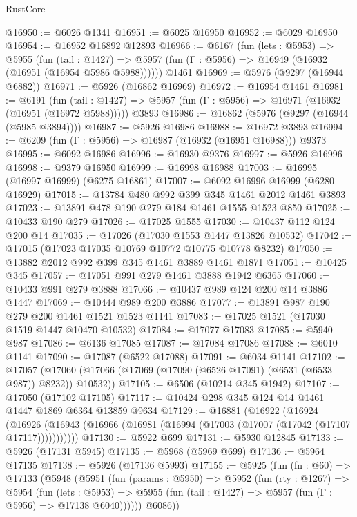 \begin{lexlean}{RustCore}
\begin{coremodule}
@16950 := @6026 @1341
@16951 := @6025 @16950
@16952 := @6029 @16950
@16954 := @16952 @16892 @12893
@16966 := @6167
    (fun (lets : @5953) =>
    @5955
      (fun (tail : @1427) =>
      @5957 (fun (Γ : @5956) => @16949 (@16932 (@16951 (@16954 @5986 @5988))))))
    @1461
@16969 := @5976 (@9297 (@16944 @6882))
@16971 := @5926 (@16862 @16969)
@16972 := @16954 @1461
@16981 := @6191
    (fun (tail : @1427) => @5957 (fun (Γ : @5956) => @16971 (@16932 (@16951 (@16972 @5988)))))
    @3893
@16986 := @16862 (@5976 (@9297 (@16944 (@5985 @3894))))
@16987 := @5926 @16986
@16988 := @16972 @3893
@16994 := @6209 (fun (Γ : @5956) => @16987 (@16932 (@16951 @16988))) @9373
@16995 := @6092 @16986
@16996 := @16930 @9376
@16997 := @5926 @16996
@16998 := @9379 @16950
@16999 := @16998 @16988
@17003 := @16995 (@16997 @16999) (@6275 @16861)
@17007 := @6092 @16996 @16999 (@6280 @16929)
@17015 := @13784 @480 @992 @399 @345 @1461 @2012 @1461 @3893
@17023 := @13891 @478 @190 @279 @184 @1461 @1555 @1523 @850
@17025 := @10433 @190 @279
@17026 := @17025 @1555
@17030 := @10437 @112 @124 @200 @14
@17035 := @17026 (@17030 @1553 @1447 @13826 @10532)
@17042 := @17015 (@17023 @17035 @10769 @10772 @10775 @10778 @8232)
@17050 := @13882 @2012 @992 @399 @345 @1461 @3889 @1461 @1871
@17051 := @10425 @345
@17057 := @17051 @991 @279 @1461 @3888 @1942 @6365
@17060 := @10433 @991 @279 @3888
@17066 := @10437 @989 @124 @200 @14 @3886 @1447
@17069 := @10444 @989 @200 @3886
@17077 := @13891 @987 @190 @279 @200 @1461 @1521 @1523 @1141
@17083 := @17025 @1521 (@17030 @1519 @1447 @10470 @10532)
@17084 := @17077 @17083
@17085 := @5940 @987
@17086 := @6136 @17085
@17087 := @17084 @17086
@17088 := @6010 @1141
@17090 := @17087 (@6522 @17088)
@17091 := @6034 @1141
@17102 := @17057
    (@17060 (@17066 (@17069 (@17090 (@6526 @17091) (@6531 (@6533 @987)) @8232)) @10532))
@17105 := @6506 (@10214 @345 @1942)
@17107 := @17050 (@17102 @17105)
@17117 := @10424 @298 @345 @124 @14 @1461 @1447 @1869 @6364 @13859 @9634
@17129 := @16881
    (@16922
      (@16924
        (@16926 (@16943 (@16966 (@16981 (@16994 (@17003 (@17007 (@17042 (@17107 @17117)))))))))))
@17130 := @5922 @699
@17131 := @5930 @12845
@17133 := @5926 (@17131 @5945)
@17135 := @5968 (@5969 @699)
@17136 := @5964 @17135
@17138 := @5926 (@17136 @5993)
@17155 := @5925
    (fun (fn : @60) =>
    @17133
      (@5948
        (@5951
          (fun (params : @5950) =>
          @5952
            (fun (rty : @1267) =>
            @5954
              (fun (lets : @5953) =>
              @5955 (fun (tail : @1427) => @5957 (fun (Γ : @5956) => @17138 @6040))))))
        @6086))

\end{coremodule}
\end{lexlean}
